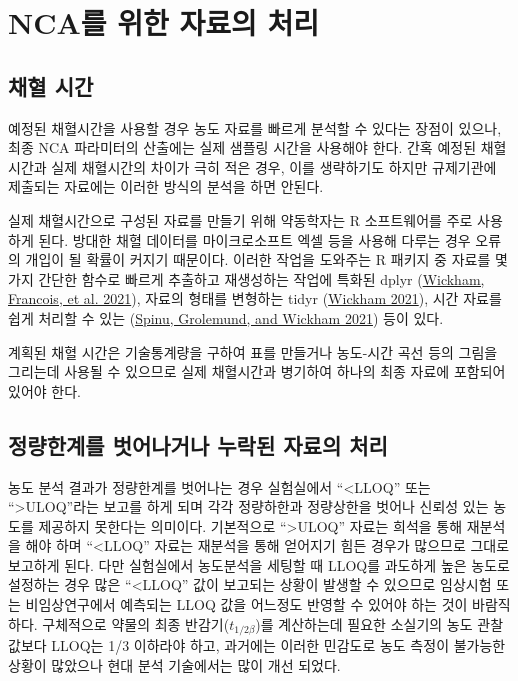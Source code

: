 \documentclass[
  11pt,
  krantz2, a4paper, twoside]{krantz}
\theoremstyle{definition}
\theoremstyle{definition}
\theoremstyle{definition}
\theoremstyle{definition}
\theoremstyle{remark}
\begin{document}
\hypertarget{data-prep}{%
\section{NCA를 위한 자료의 처리}\label{data-prep}}

\hypertarget{uxcc44uxd608-uxc2dcuxac04}{%
\subsection{채혈 시간}\label{uxcc44uxd608-uxc2dcuxac04}}

예정된 채혈시간을 사용할 경우 농도 자료를 빠르게 분석할 수 있다는 장점이 있으나, 최종 NCA 파라미터의 산출에는 실제 샘플링 시간을 사용해야 한다. 간혹 예정된 채혈시간과 실제 채혈시간의 차이가 극히 적은 경우, 이를 생략하기도 하지만 규제기관에 제출되는 자료에는 이러한 방식의 분석을 하면 안된다.

실제 채혈시간으로 구성된 자료를 만들기 위해 약동학자는 R 소프트웨어를 주로 사용하게 된다. 방대한 채혈 데이터를 마이크로소프트 엑셀 등을 사용해 다루는 경우 오류의 개입이 될 확률이 커지기 때문이다. 이러한 작업을 도와주는 R 패키지 중 자료를 몇가지 간단한 함수로 빠르게 추출하고 재생성하는 작업에 특화된 dplyr (\protect\hyperlink{ref-R-dplyr}{Wickham, Francois, et al. 2021}), 자료의 형태를 변형하는 tidyr (\protect\hyperlink{ref-R-tidyr}{Wickham 2021}), 시간 자료를 쉽게 처리할 수 있는 (\protect\hyperlink{ref-R-lubridate}{Spinu, Grolemund, and Wickham 2021}) 등이 있다. 

계획된 채혈 시간은 기술통계량을 구하여 표를 만들거나 농도-시간 곡선 등의 그림을 그리는데 사용될 수 있으므로 실제 채혈시간과 병기하여 하나의 최종 자료에 포함되어 있어야 한다.

\hypertarget{uxc815uxb7c9uxd55cuxacc4uxb97c-uxbc97uxc5b4uxb098uxac70uxb098-uxb204uxb77duxb41c-uxc790uxb8ccuxc758-uxcc98uxb9ac}{%
\subsection{정량한계를 벗어나거나 누락된 자료의 처리}\label{uxc815uxb7c9uxd55cuxacc4uxb97c-uxbc97uxc5b4uxb098uxac70uxb098-uxb204uxb77duxb41c-uxc790uxb8ccuxc758-uxcc98uxb9ac}}

농도 분석 결과가 정량한계를 벗어나는 경우 실험실에서 ``\textless LLOQ'' 또는 ``\textgreater ULOQ''라는 보고를 하게 되며 각각 정량하한과 정량상한을 벗어나 신뢰성 있는 농도를 제공하지 못한다는 의미이다. 기본적으로 ``\textgreater ULOQ'' 자료는 희석을 통해 재분석을 해야 하며 ``\textless LLOQ'' 자료는 재분석을 통해 얻어지기 힘든 경우가 많으므로 그대로 보고하게 된다. 다만 실험실에서 농도분석을 세팅할 때 LLOQ를 과도하게 높은 농도로 설정하는 경우 많은 ``\textless LLOQ'' 값이 보고되는 상황이 발생할 수 있으므로 임상시험 또는 비임상연구에서 예측되는 LLOQ 값을 어느정도 반영할 수 있어야 하는 것이 바람직하다. 구체적으로 약물의 최종 반감기(\(t_{1/2\beta}\))를 계산하는데 필요한 소실기의 농도 관찰값보다 LLOQ는 1/3 이하라야 하고, 과거에는 이러한 민감도로 농도 측정이 불가능한 상황이 많았으나 현대 분석 기술에서는 많이 개선 되었다.
\end{document}
